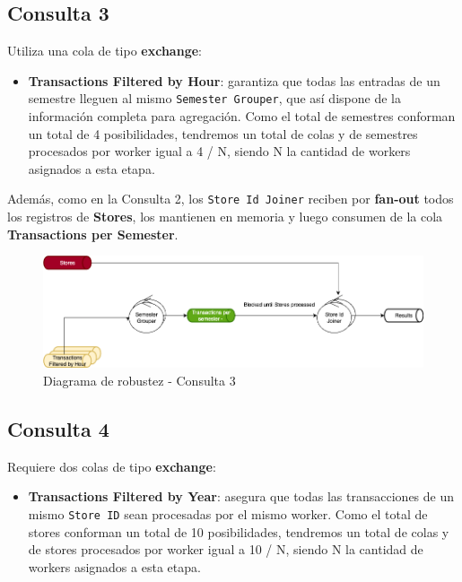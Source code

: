 \documentclass[titlepage,a4paper]{article}
\begin{document}
\subsection*{Consulta 3}
Utiliza una cola de tipo \textbf{exchange}:

\begin{itemize}
    \item \textbf{Transactions Filtered by Hour}: garantiza que todas las entradas de un semestre lleguen al mismo \texttt{Semester Grouper}, que así dispone de la información completa para agregación. Como el total de semestres conforman un total de 4 posibilidades, tendremos un total de colas y de semestres procesados por worker igual a 4 / N, siendo N la cantidad de workers asignados a esta etapa.
\end{itemize}

Además, como en la Consulta 2, los \texttt{Store Id Joiner} reciben por \textbf{fan-out} todos los registros de \textbf{Stores}, los mantienen en memoria y luego consumen de la cola \textbf{Transactions per Semester}.

\begin{figure}[H]
    \centering
    \includegraphics[width=1.0\textwidth]{consulta3.png}
    \caption{Diagrama de robustez - Consulta 3}
\end{figure}



\subsection*{Consulta 4}
Requiere dos colas de tipo \textbf{exchange}:

\begin{itemize}
    \item \textbf{Transactions Filtered by Year}: asegura que todas las transacciones de un mismo \texttt{Store ID} sean procesadas por el mismo worker. Como el total de stores conforman un total de 10 posibilidades, tendremos un total de colas y de stores procesados por worker igual a 10 / N, siendo N la cantidad de workers asignados a esta etapa.
\end{itemize}
\end{document}
